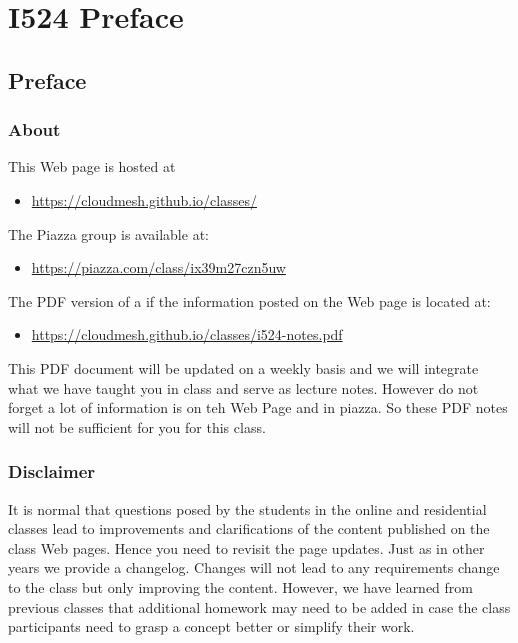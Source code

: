 


\chapter{I524 Preface}
\label{\detokenize{notes:i524-notes}}\label{\detokenize{notes:i524-preface}}

\section{Preface}
\label{\detokenize{i524/preface/index::doc}}\label{\detokenize{i524/preface/index:preface}}

\subsection{About}
\label{\detokenize{i524/preface/about:about}}\label{\detokenize{i524/preface/about::doc}}
This Web page is hosted at
\begin{itemize}
\item {} 
\url{https://cloudmesh.github.io/classes/}

\end{itemize}

The Piazza group is available at:
\begin{itemize}
\item {} 
\url{https://piazza.com/class/ix39m27czn5uw}

\end{itemize}

The PDF version of a  if the information posted on the Web
page is located at:
\begin{itemize}
\item {} 
\url{https://cloudmesh.github.io/classes/i524-notes.pdf}

\end{itemize}

This PDF document will be updated on a weekly basis and we will
integrate what we have taught you in class and serve as lecture notes.
However do not forget a lot of information is on teh Web Page and in
piazza. So these PDF notes will not be sufficient for you for this
class.


\subsection{Disclaimer}
\label{\detokenize{i524/preface/disclaimer::doc}}\label{\detokenize{i524/preface/disclaimer:disclaimer}}
It is normal that questions posed by the students in the
online and residential classes lead to improvements and clarifications
of the content published on the class Web pages. Hence you need to
revisit the page updates. Just as in other years we provide a
changelog. Changes will not lead to any requirements change to the class
but only improving the content. However, we have learned from previous
classes that additional homework may need to be added in case the
class participants need to grasp a concept better or simplify their
work.

